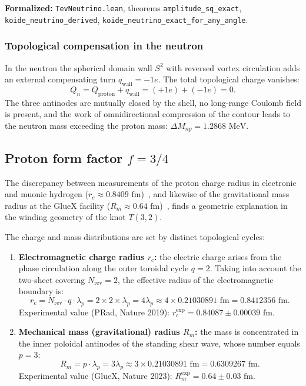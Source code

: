 \documentclass[11pt,a4paper]{article}
\theoremstyle{definition}
\theoremstyle{remark}
\begin{document}
\noindent\small\textbf{Formalized:} \texttt{TevNeutrino.lean}, theorems \texttt{amplitude_sq_exact}, \texttt{koide_neutrino_derived}, \texttt{koide_neutrino_exact_for_any_angle}.

\subsubsection{Topological compensation in the neutron}

In the neutron the spherical domain wall $S^2$ with reversed vortex circulation adds an external compensating turn $q_{\mathrm{wall}} = -1e$. The total topological charge vanishes:
\begin{equation}
	Q_n = Q_{\mathrm{proton}} + q_{\mathrm{wall}} = (+1e) + (-1e) = 0.
	\label{eq:neutron_charge_neutral}
\end{equation}
The three antinodes are mutually closed by the shell, no long-range Coulomb field is present, and the work of omnidirectional compression of the contour leads to the neutron mass exceeding the proton mass: $\Delta M_{np} = 1.2868\text{ MeV}$.
	
\subsection{Proton form factor $f = 3/4$}
	
The discrepancy between measurements of the proton charge radius in electronic and muonic hydrogen ($r_c \approx 0.8409\text{ fm}$)~\cite{PRad2019}, and likewise of the gravitational mass radius at the GlueX facility ($R_m \approx 0.64\text{ fm}$)~\cite{GlueX2023}, finds a geometric explanation in the winding geometry of the knot $T(3,2)$.
	
The charge and mass distributions are set by distinct topological cycles:
\begin{enumerate}
	\item \textbf{Electromagnetic charge radius $r_c$:} the electric charge arises from the phase circulation along the outer toroidal cycle $q=2$. Taking into account the two-sheet covering $N_{\mathrm{rev}} = 2$, the effective radius of the electromagnetic boundary is:
\begin{equation}
	r_c = N_{\mathrm{rev}} \cdot q \cdot \lambda_p = 2 \times 2 \times \lambda_p = 4 \lambda_p \approx 4 \times 0.21030891\text{ fm} = 0.8412356\text{ fm}.
	\label{eq:charge_radius_formula}
\end{equation}
Experimental value (PRad, Nature 2019): $r_c^{\mathrm{exp}} = 0.84087 \pm 0.00039\text{ fm}$.
		
\item \textbf{Mechanical mass (gravitational) radius $R_m$:} the mass is concentrated in the inner poloidal antinodes of the standing shear wave, whose number equals $p=3$:
\begin{equation}
	R_m = p \cdot \lambda_p = 3 \lambda_p \approx 3 \times 0.21030891\text{ fm} = 0.6309267\text{ fm}.
	\label{eq:mass_radius_formula}
\end{equation}
Experimental value (GlueX, Nature 2023): $R_m^{\mathrm{exp}} = 0.64 \pm 0.03\text{ fm}$.
\end{enumerate}
	
\end{document}
